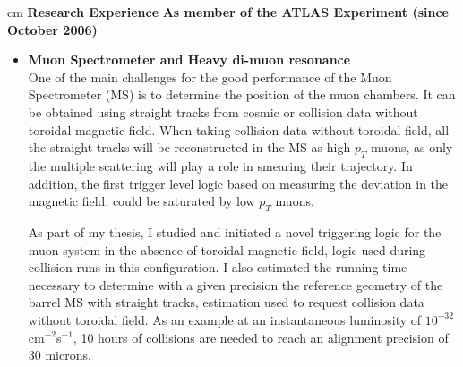 \documentclass[12pt]{article}
\begin{document}
 cm
{\bf \large Research Experience}
\vskip 0.2cm
\hskip 0.1cm {\bf As member of the ATLAS Experiment (since October 2006)}\\
\begin{itemize}[leftmargin=1.3cm]
\itemsep0.8em

 \item[] {\bf Muon Spectrometer and Heavy di-muon resonance}\\
One of the main challenges for the good performance of the Muon Spectrometer (MS) is to determine the position of the muon chambers. 
It can be obtained using straight tracks from cosmic or collision data without toroidal magnetic field. 
When taking collision data without toroidal field, all the straight tracks will be reconstructed in the MS as high $p_T$ muons, as only the multiple 
scattering will play a role in smearing their trajectory. In addition, the first trigger level logic based on measuring the deviation in the magnetic field,
could be saturated by low $p_T$ muons.
\vspace{2.5mm}

As part of my thesis, I studied and initiated a novel triggering logic for the muon system in the absence of toroidal magnetic field, logic used during 
collision runs in this configuration. I also estimated the running time necessary to determine with a given precision the reference geometry 
of the barrel MS with straight tracks, estimation used to request collision data without toroidal field. 
As an example at an instantaneous luminosity of $10^{-32}$ cm$^{-2}$s$^{-1}$, 10 hours of collisions are needed to reach an alignment precision of 30 microns. 
\vspace{2.5mm}


\end{itemize}
\end{document}
